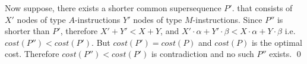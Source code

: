 Now suppose, there exists a shorter common supersequence $P'$. 
that consists of $X'$ nodes of type $A$-instructions $Y'$ nodes of type $M$-instructions. Since $P''$ is shorter than $P'$, therefore $X' + Y' < X + Y$, and $X' \cdot \alpha + Y' \cdot \beta < X \cdot \alpha + Y \cdot \beta$ i.e. $\mathit{cost}(P'') < \mathit{cost}(P')$. But $\mathit{cost}(P') = \mathit{cost}(P)$ and $\mathit{cost}(P)$ is the optimal cost.  Therefore $\mathit{cost}(P'') < \mathit{cost}(P')$ is contradiction and no such $P''$ exists. \qed

